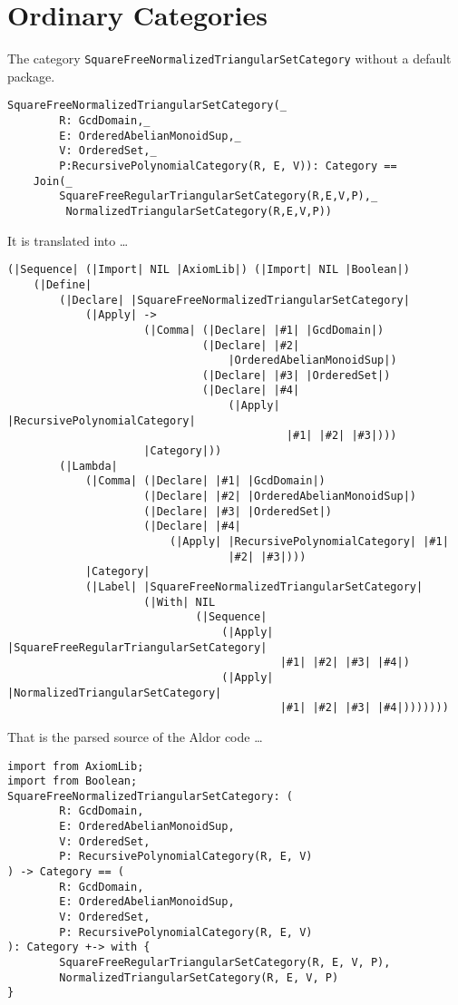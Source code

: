 \documentclass{article}
\begin{document}
\section{Ordinary Categories}\label{sec:Category}
The category \verb'SquareFreeNormalizedTriangularSetCategory' without
a default package.
\begin{verbatim}
SquareFreeNormalizedTriangularSetCategory(_
        R: GcdDomain,_
        E: OrderedAbelianMonoidSup,_
        V: OrderedSet,_
        P:RecursivePolynomialCategory(R, E, V)): Category == 
    Join(_
        SquareFreeRegularTriangularSetCategory(R,E,V,P),_
         NormalizedTriangularSetCategory(R,E,V,P))
\end{verbatim}
It is translated into \ldots
\begin{verbatim}
(|Sequence| (|Import| NIL |AxiomLib|) (|Import| NIL |Boolean|)
    (|Define|
        (|Declare| |SquareFreeNormalizedTriangularSetCategory|
            (|Apply| ->
                     (|Comma| (|Declare| |#1| |GcdDomain|)
                              (|Declare| |#2|
                                  |OrderedAbelianMonoidSup|)
                              (|Declare| |#3| |OrderedSet|)
                              (|Declare| |#4|
                                  (|Apply| |RecursivePolynomialCategory|
                                           |#1| |#2| |#3|)))
                     |Category|))
        (|Lambda|
            (|Comma| (|Declare| |#1| |GcdDomain|)
                     (|Declare| |#2| |OrderedAbelianMonoidSup|)
                     (|Declare| |#3| |OrderedSet|)
                     (|Declare| |#4|
                         (|Apply| |RecursivePolynomialCategory| |#1|
                                  |#2| |#3|)))
            |Category|
            (|Label| |SquareFreeNormalizedTriangularSetCategory|
                     (|With| NIL
                             (|Sequence|
                                 (|Apply| |SquareFreeRegularTriangularSetCategory|
                                          |#1| |#2| |#3| |#4|)
                                 (|Apply| |NormalizedTriangularSetCategory|
                                          |#1| |#2| |#3| |#4|)))))))
\end{verbatim}
That is the parsed source of the Aldor code \ldots
\begin{verbatim}
import from AxiomLib;
import from Boolean;
SquareFreeNormalizedTriangularSetCategory: (
        R: GcdDomain,
        E: OrderedAbelianMonoidSup,
        V: OrderedSet,
        P: RecursivePolynomialCategory(R, E, V)
) -> Category == (
        R: GcdDomain,
        E: OrderedAbelianMonoidSup,
        V: OrderedSet,
        P: RecursivePolynomialCategory(R, E, V)
): Category +-> with {
        SquareFreeRegularTriangularSetCategory(R, E, V, P),
        NormalizedTriangularSetCategory(R, E, V, P)
}
\end{verbatim}
\end{document}
